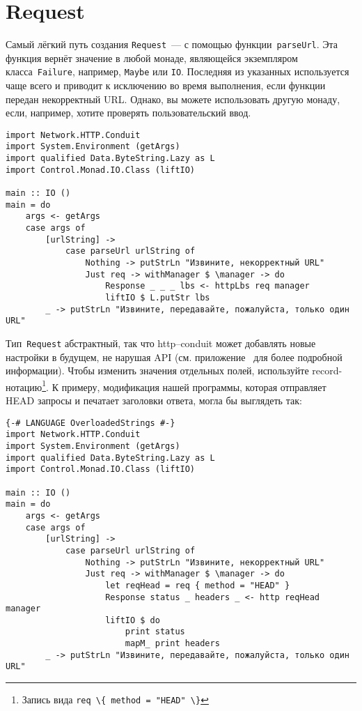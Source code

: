 \section{Request}
Самый лёгкий путь создания \lstinline!Request!~--- с помощью
функции~\lstinline!parseUrl!. Эта функция вернёт значение в любой
монаде, являющейся экземпляром класса~\lstinline!Failure!, например,
\lstinline!Maybe! или \lstinline!IO!. Последняя из указанных
используется чаще всего и приводит к исключению во время выполнения,
если функции передан некорректный URL. Однако, вы можете использовать
другую монаду, если, например, хотите проверять пользовательский ввод.
\begin{lstlisting}
import Network.HTTP.Conduit
import System.Environment (getArgs)
import qualified Data.ByteString.Lazy as L
import Control.Monad.IO.Class (liftIO)

main :: IO ()
main = do
    args <- getArgs
    case args of
        [urlString] ->
            case parseUrl urlString of
                Nothing -> putStrLn "Извините, некорректный URL"
                Just req -> withManager $ \manager -> do
                    Response _ _ _ lbs <- httpLbs req manager
                    liftIO $ L.putStr lbs
        _ -> putStrLn "Извините, передавайте, пожалуйста, только один URL"
\end{lstlisting}
Тип~\lstinline!Request! абстрактный, так что http--conduit может
добавлять новые настройки в будущем, не нарушая API
(см. приложение~ для более подробной
информации). Чтобы изменить значения отдельных полей, используйте
record-нотацию\footnote{Запись вида \lstinline'req \{ method = "HEAD" \}'}. К примеру, модификация
нашей программы, которая отправляет HEAD запросы и печатает заголовки
ответа, могла бы выглядеть так:
\begin{lstlisting}
{-# LANGUAGE OverloadedStrings #-}
import Network.HTTP.Conduit
import System.Environment (getArgs)
import qualified Data.ByteString.Lazy as L
import Control.Monad.IO.Class (liftIO)

main :: IO ()
main = do
    args <- getArgs
    case args of
        [urlString] ->
            case parseUrl urlString of
                Nothing -> putStrLn "Извините, некорректный URL"
                Just req -> withManager $ \manager -> do
                    let reqHead = req { method = "HEAD" }
                    Response status _ headers _ <- http reqHead manager
                    liftIO $ do
                        print status
                        mapM_ print headers
        _ -> putStrLn "Извините, передавайте, пожалуйста, только один URL"
\end{lstlisting} %

